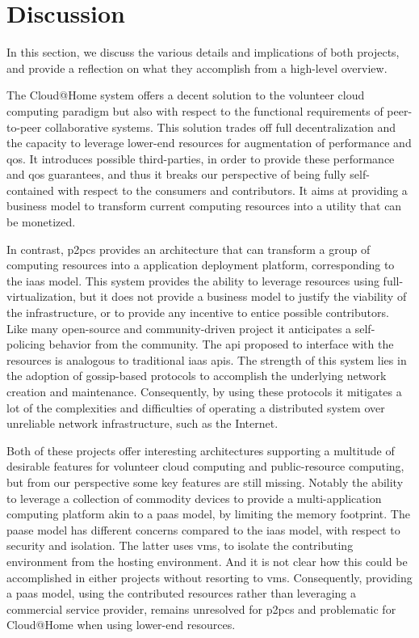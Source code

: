 \documentclass[12pt, titlepage]{uo_temp}
\begin{document}
     \section{Discussion}
     In this section, we discuss the various details and implications of both projects, and
     provide a reflection on what they accomplish from a high-level overview.

     The Cloud@Home system offers a decent solution to the volunteer cloud computing
     paradigm but also with respect to the functional requirements of peer-to-peer
     collaborative systems. This solution trades off full decentralization and the
     capacity to leverage lower-end resources for augmentation of performance and
     \gls{qos}. It introduces possible third-parties, in order to provide these
     performance and \gls{qos} guarantees, and thus it breaks our perspective of being
     fully self-contained with respect to the consumers and contributors. It aims at
     providing a business model to transform current computing resources into a utility
     that can be monetized.

     In contrast, \gls{p2pcs} provides an architecture that can transform a group of
     computing resources into a application deployment platform, corresponding to the
     \gls{iaas} model. This system provides the ability to leverage resources using
     full-virtualization, but it does not provide a business model to justify the
     viability of the infrastructure, or to provide any incentive to entice possible
     contributors. Like many open-source and community-driven project it anticipates a
     self-policing behavior from the community. The \gls{api} proposed to interface with
     the resources is analogous to traditional \gls{iaas} \gls{api}s. The strength of this
     system lies in the adoption of gossip-based protocols to accomplish the underlying
     network creation and maintenance. Consequently, by using these protocols it mitigates
     a lot of the complexities and difficulties of operating a distributed system over
     unreliable network infrastructure, such as the Internet.

     Both of these projects offer interesting architectures supporting a multitude of
     desirable features for volunteer cloud computing and public-resource computing, but
     from our perspective some key features are still missing. Notably the ability to
     leverage a collection of commodity devices to provide a multi-application computing
     platform akin to a \gls{paas} model, by limiting the memory footprint. The
     \gls{paas}e model has different concerns compared to the \gls{iaas} model, with
     respect to security and isolation. The latter uses \gls{vm}s, to isolate the
     contributing environment from the hosting environment. And it is not clear how this
     could be accomplished in either projects without resorting to \gls{vm}s. Consequently,
     providing a \gls{paas} model, using the contributed resources rather than
     leveraging a commercial service provider, remains unresolved for \gls{p2pcs} and
     problematic for Cloud@Home when using lower-end resources.
\end{document}
